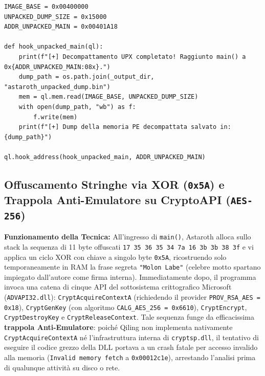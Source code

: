 \documentclass[11pt, a4paper]{article}
\begin{document}
\begin{lstlisting}[style=pythoncode, caption={Decompattamento automatico UPX in Qiling e dump dell'immagine PE ricostruita all'ingresso di main().}, label={lst:astaroth_upx}]
IMAGE_BASE = 0x00400000
UNPACKED_DUMP_SIZE = 0x15000
ADDR_UNPACKED_MAIN = 0x00401A18

def hook_unpacked_main(ql):
    print(f"[+] Decompattamento UPX completato! Raggiunto main() a 0x{ADDR_UNPACKED_MAIN:08x}.")
    dump_path = os.path.join(_output_dir, "astaroth_unpacked_dump.bin")
    mem = ql.mem.read(IMAGE_BASE, UNPACKED_DUMP_SIZE)
    with open(dump_path, "wb") as f:
        f.write(mem)
    print(f"[+] Dump della memoria PE decompattata salvato in: {dump_path}")

ql.hook_address(hook_unpacked_main, ADDR_UNPACKED_MAIN)
\end{lstlisting}

\subsection{Offuscamento Stringhe via XOR (\texttt{0x5A}) e Trappola Anti-Emulatore su CryptoAPI (\texttt{AES-256})}

\textbf{Funzionamento della Tecnica:} All'ingresso di \texttt{main()}, Astaroth alloca sullo stack la sequenza di 11 byte offuscati \texttt{17 35 36 35 34 7a 16 3b 3b 38 3f} e vi applica un ciclo XOR con chiave a singolo byte \texttt{0x5A}, ricostruendo solo temporaneamente in RAM la frase segreta \texttt{"Molon Labe"} (celebre motto spartano impiegato dall'autore come firma interna). Immediatamente dopo, il programma invoca una catena di cinque API del sottosistema crittografico Microsoft (\texttt{ADVAPI32.dll}): \texttt{Crypt\allowbreak{}Acquire\allowbreak{}ContextA} (richiedendo il provider \texttt{PROV\_\allowbreak{}RSA\_\allowbreak{}AES = 0x18}), \texttt{CryptGenKey} (con algoritmo \texttt{CALG\_\allowbreak{}AES\_\allowbreak{}256 = 0x6610}), \texttt{CryptEncrypt}, \texttt{Crypt\allowbreak{}Destroy\allowbreak{}Key} e \texttt{Crypt\allowbreak{}Release\allowbreak{}Context}. Tale sequenza funge da efficacissima \textbf{trappola Anti-Emulatore}: poich\'e Qiling non implementa nativamente \texttt{Crypt\allowbreak{}Acquire\allowbreak{}ContextA} n\'e l'infrastruttura interna di \texttt{cryptsp.dll}, il tentativo di eseguire il codice grezzo della DLL portava a un crash fatale per accesso invalido alla memoria (\texttt{Invalid memory fetch} a \texttt{0x00012c1e}), arrestando l'analisi prima di qualunque attivit\`a su disco o rete.
\end{document}
